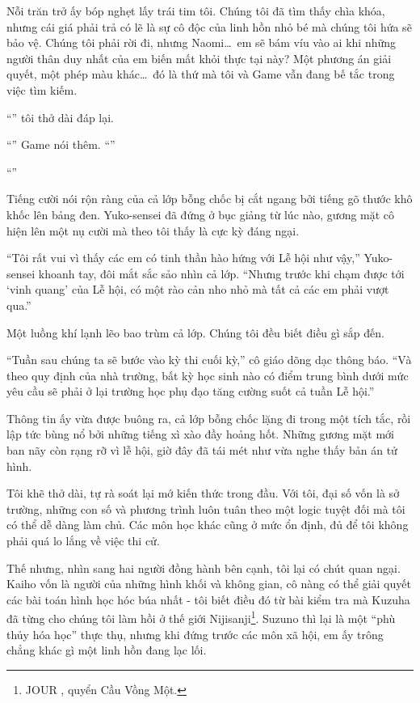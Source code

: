 \documentclass[../main.tex]{subfiles}
\begin{document}
Nỗi trăn trở ấy bóp nghẹt lấy trái tim tôi. Chúng tôi đã tìm thấy chìa khóa, nhưng cái giá phải trả có lẽ là sự cô độc của linh hồn nhỏ bé mà chúng tôi hứa sẽ bảo vệ. Chúng tôi phải rời đi, nhưng Naomi\dots\ em sẽ bám víu vào ai khi những người thân duy nhất của em biến mất khỏi thực tại này? Một phương án giải quyết, một phép màu khác\dots\ đó là thứ mà tôi và Game vẫn đang bế tắc trong việc tìm kiếm.

``'' tôi thở dài đáp lại.

``'' Game nói thêm. ``''

``''

Tiếng cười nói rộn ràng của cả lớp bỗng chốc bị cắt ngang bởi tiếng gõ thước khô khốc lên bảng đen. Yuko-sensei đã đứng ở bục giảng từ lúc nào, gương mặt cô hiện lên một nụ cười mà theo tôi thấy là cực kỳ đáng ngại.

``Tôi rất vui vì thấy các em có tinh thần hào hứng với Lễ hội như vậy,'' Yuko-sensei khoanh tay, đôi mắt sắc sảo nhìn cả lớp. ``Nhưng trước khi chạm được tới `vinh quang' của Lễ hội, có một rào cản nho nhỏ mà tất cả các em phải vượt qua.''

Một luồng khí lạnh lẽo bao trùm cả lớp. Chúng tôi đều biết điều gì sắp đến.

``Tuần sau chúng ta sẽ bước vào kỳ thi cuối kỳ,'' cô giáo dõng dạc thông báo. ``Và theo quy định của nhà trường, bất kỳ học sinh nào có điểm trung bình dưới mức yêu cầu sẽ phải ở lại trường học phụ đạo tăng cường suốt cả tuần Lễ hội.''

Thông tin ấy vừa được buông ra, cả lớp bỗng chốc lặng đi trong một tích tắc, rồi lập tức bùng nổ bởi những tiếng xì xào đầy hoảng hốt. Những gương mặt mới ban nãy còn rạng rỡ vì lễ hội, giờ đây đã tái mét như vừa nghe thấy bản án tử hình.

Tôi khẽ thở dài, tự rà soát lại mớ kiến thức trong đầu. Với tôi, đại số vốn là sở trường, những con số và phương trình luôn tuân theo một logic tuyệt đối mà tôi có thể dễ dàng làm chủ. Các môn học khác cũng ở mức ổn định, đủ để tôi không phải quá lo lắng về việc thi cử.

Thế nhưng, nhìn sang hai người đồng hành bên cạnh, tôi lại có chút quan ngại. Kaiho vốn là người của những hình khối và không gian, cô nàng có thể giải quyết các bài toán hình học hóc búa nhất - tôi biết điều đó từ bài kiểm tra mà Kuzuha đã từng cho chúng tôi làm hồi ở thế giới Nijisanji\footnote{{\flaregothic JOUR }, quyển Cầu Vồng Một.}. Suzuno thì lại là một ``phù thủy hóa học'' thực thụ, nhưng khi đứng trước các môn xã hội, em ấy trông chẳng khác gì một linh hồn đang lạc lối.
\end{document}
